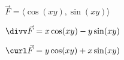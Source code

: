 {$\vec F = \langle \cos (xy), \sin (xy)\rangle$
}
{$\divv \vec F = x\cos(xy)-y\sin(xy)$

$\curl \vec F = y\cos(xy)+x\sin(xy)$}
